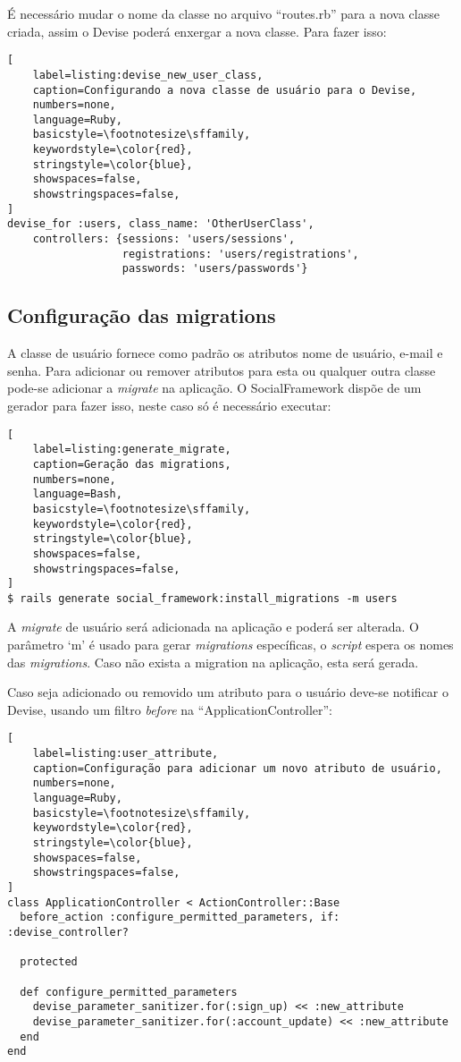 É necessário mudar o nome da classe no arquivo ``routes.rb'' para a nova classe criada, assim o Devise poderá enxergar a nova classe. Para fazer isso:

\begin{lstlisting}[
    label=listing:devise_new_user_class,
    caption=Configurando a nova classe de usuário para o Devise,
    numbers=none,
    language=Ruby,
    basicstyle=\footnotesize\sffamily,
    keywordstyle=\color{red},
    stringstyle=\color{blue},
    showspaces=false,
    showstringspaces=false,
]
devise_for :users, class_name: 'OtherUserClass',
    controllers: {sessions: 'users/sessions',
                  registrations: 'users/registrations',
                  passwords: 'users/passwords'}
\end{lstlisting}

\subsection{Configuração das migrations}

A classe de usuário fornece como padrão os atributos nome de usuário, e-mail e senha. Para adicionar ou remover atributos para esta ou qualquer outra classe pode-se adicionar a \textit{migrate} na aplicação. O SocialFramework dispõe de um gerador para fazer isso, neste caso só é necessário executar:

\begin{lstlisting}[
    label=listing:generate_migrate,
    caption=Geração das migrations,
    numbers=none,
    language=Bash,
    basicstyle=\footnotesize\sffamily,
    keywordstyle=\color{red},
    stringstyle=\color{blue},
    showspaces=false,
    showstringspaces=false,
]
$ rails generate social_framework:install_migrations -m users
\end{lstlisting}

A \textit{migrate} de usuário será adicionada na aplicação e poderá ser alterada. O parâmetro `m' é usado para gerar \textit{migrations} específicas, o \textit{script} espera os nomes das \textit{migrations}. Caso não exista a migration na aplicação, esta será gerada.

Caso seja adicionado ou removido um atributo para o usuário deve-se notificar o Devise, usando um filtro \textit{before} na ``ApplicationController'':

\begin{lstlisting}[
    label=listing:user_attribute,
    caption=Configuração para adicionar um novo atributo de usuário,
    numbers=none,
    language=Ruby,
    basicstyle=\footnotesize\sffamily,
    keywordstyle=\color{red},
    stringstyle=\color{blue},
    showspaces=false,
    showstringspaces=false,
]
class ApplicationController < ActionController::Base
  before_action :configure_permitted_parameters, if: :devise_controller?

  protected

  def configure_permitted_parameters
    devise_parameter_sanitizer.for(:sign_up) << :new_attribute
    devise_parameter_sanitizer.for(:account_update) << :new_attribute
  end
end
\end{lstlisting}

